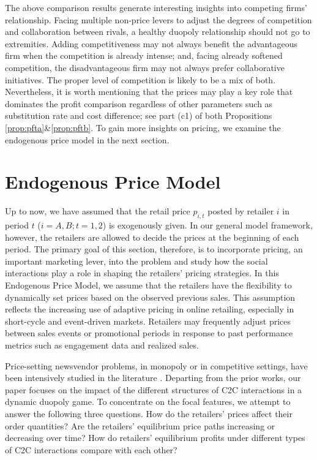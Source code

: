 \documentclass[nonblindrev,copyedit]{informs1}
\begin{document}
The above comparison results generate interesting insights into competing firms' relationship. Facing multiple non-price levers to adjust the degrees of competition and collaboration between rivals, a healthy duopoly relationship should not go to extremities. Adding competitiveness may not always benefit the advantageous firm when the competition is already intense; and, facing already softened competition, the disadvantageous firm may not always prefer collaborative initiatives. The proper level of competition is likely to be a mix of both. Nevertheless, it is worth mentioning that the prices may play a key role that dominates the profit comparison regardless of other parameters such as substitution rate and cost difference; see part (c1) of both Propositions \ref{prop:pfta}\&\ref{prop:pftb}. To gain more insights on pricing, we examine the endogenous price model in the next section.

\section{Endogenous Price Model}\label{sec:pricing}

Up to now, we have assumed that the retail price $p_{i,t}$ posted by retailer $i$ in period $t$ ($i=A,B; t=1,2$) is exogenously given. In our general model framework, however, the retailers are allowed to decide the prices at the beginning of each period. The primary goal of this section, therefore, is to incorporate pricing, an important marketing lever, into the problem and study how the social interactions play a role in shaping the retailers' pricing strategies. In this Endogenous Price Model, we assume that the retailers have the flexibility to dynamically set prices based on the observed previous sales. This assumption reflects the increasing use of adaptive pricing in online retailing, especially in short-cycle and event-driven markets. Retailers may frequently adjust prices between sales events or promotional periods in response to past performance metrics such as engagement data and realized sales.

Price-setting newsvendor problems, in monopoly or in competitive settings, have been intensively studied in the literature \citep[see, e.g.,][]{pd1999, za2008, sa2011}. Departing from the prior works, our paper focuses on the impact of the different structures of C2C interactions in a dynamic duopoly game. To concentrate on the focal features, we attempt to answer the following three questions. How do the retailers' prices affect their order quantities? Are the retailers' equilibrium price paths increasing or decreasing over time? How do retailers' equilibrium profits under different types of C2C interactions compare with each other?
\end{document}
